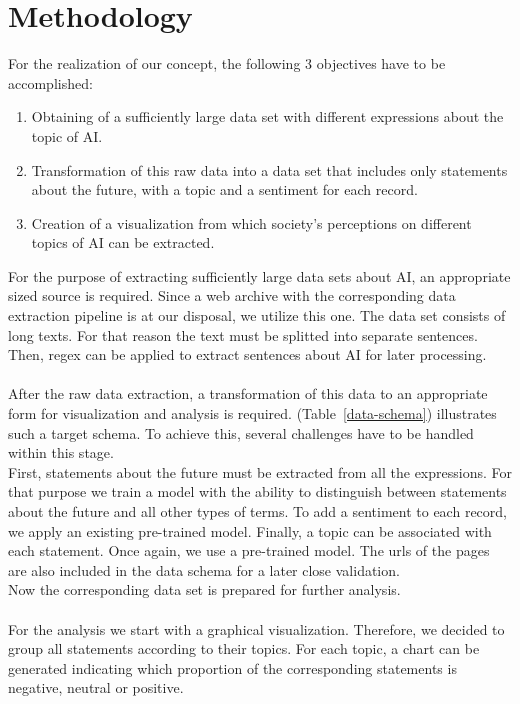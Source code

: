 \section{Methodology}

For the realization of our concept, the following 3 objectives have to be accomplished:

\begin{enumerate}
    \item Obtaining of a sufficiently large data set with different expressions about the topic of AI.
    \item Transformation of this raw data into a data set that includes only statements about the future, with a topic and a sentiment for each record.
    \item Creation of a visualization from which society's perceptions on different topics of AI can be extracted.
\end{enumerate}%
%
%
For the purpose of extracting sufficiently large data sets about AI, an appropriate sized source is required.
Since a web archive with the corresponding data extraction pipeline is at our disposal, we utilize this one.
The data set consists of long texts.
For that reason the text must be splitted into separate sentences.
Then, regex can be applied to extract sentences about AI for later processing.
\\
\\
After the raw data extraction, a transformation of this data to an appropriate form for visualization and analysis is required.
(Table~\ref{data-schema}) illustrates such a target schema.
To achieve this, several challenges have to be handled within this stage.
\\
First, statements about the future must be extracted from all the expressions.
For that purpose we train a model with the ability to distinguish between statements about the future and all other types of terms.
To add a sentiment to each record, we apply an existing pre-trained model.
Finally, a topic can be associated with each statement.
Once again, we use a pre-trained model.
The urls of the pages are also included in the data schema for a later close validation.
\\
Now the corresponding data set is prepared for further analysis.
\\
\\
For the analysis we start with a graphical visualization.
Therefore, we decided to group all statements according to their topics.
For each topic, a chart can be generated indicating which proportion of the corresponding statements is negative, neutral or positive.

